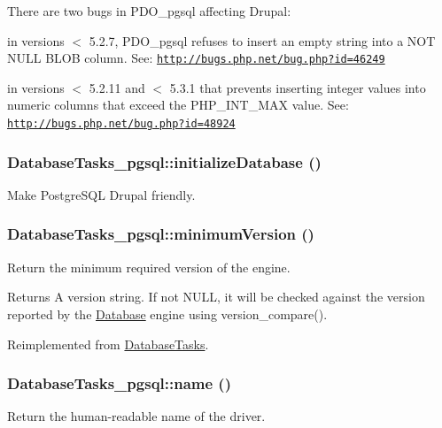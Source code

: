 There are two bugs in PDO\_\-pgsql affecting Drupal:


\begin{DoxyItemize}
\item in versions $<$ 5.2.7, PDO\_\-pgsql refuses to insert an empty string into a NOT NULL BLOB column. See: \href{http://bugs.php.net/bug.php?id=46249}{\tt http://bugs.php.net/bug.php?id=46249}
\item in versions $<$ 5.2.11 and $<$ 5.3.1 that prevents inserting integer values into numeric columns that exceed the PHP\_\-INT\_\-MAX value. See: \href{http://bugs.php.net/bug.php?id=48924}{\tt http://bugs.php.net/bug.php?id=48924} 
\end{DoxyItemize}\hypertarget{classDatabaseTasks__pgsql_aebebf924da7c07aee778afd5ddeef94e}{
\subsubsection[{initializeDatabase}]{\setlength{\rightskip}{0pt plus 5cm}DatabaseTasks\_\-pgsql::initializeDatabase ()}}
\label{classDatabaseTasks__pgsql_aebebf924da7c07aee778afd5ddeef94e}
Make PostgreSQL Drupal friendly. \hypertarget{classDatabaseTasks__pgsql_abf42cc0a5aa01ae5c146277419f394ae}{
\subsubsection[{minimumVersion}]{\setlength{\rightskip}{0pt plus 5cm}DatabaseTasks\_\-pgsql::minimumVersion ()}}
\label{classDatabaseTasks__pgsql_abf42cc0a5aa01ae5c146277419f394ae}
Return the minimum required version of the engine.

\begin{DoxyReturn}{Returns}
A version string. If not NULL, it will be checked against the version reported by the \hyperlink{classDatabase}{Database} engine using version\_\-compare(). 
\end{DoxyReturn}


Reimplemented from \hyperlink{classDatabaseTasks_a840dd551944911605ee2e139a434efea}{DatabaseTasks}.\hypertarget{classDatabaseTasks__pgsql_afe779086f177b48b3441372136e2d560}{
\subsubsection[{name}]{\setlength{\rightskip}{0pt plus 5cm}DatabaseTasks\_\-pgsql::name ()}}
\label{classDatabaseTasks__pgsql_afe779086f177b48b3441372136e2d560}
Return the human-\/readable name of the driver. 

